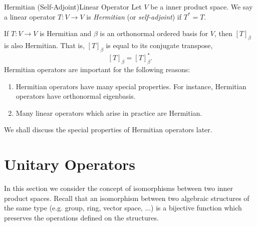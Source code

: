 \documentclass[linearalgebraII]{subfiles}
\begin{document}
    \begin{definition}{Hermitian (Self-Adjoint)}{Linear Operator}
        Let $V$ be a inner product space. We say a linear operator $T:V\to V$ is \emph{Hermitian} (or \emph{self-adjoint}) if $T^* = T$.
    \end{definition}

    \noindent If $T:V\to V$ is Hermitian and $\beta$ is an orthonormal ordered basis for $V$, then $\left[ T \right] _\beta$ is also Hermitian. That is, $\left[ T \right] _\beta$ is equal to its conjugate transpose,
    \begin{equation*}
        \left[ T \right] _\beta = \left[ T \right] _\beta^*.
    \end{equation*}
    Hermitian operators are important for the following reasons:
    \begin{enumerate}
        \item Hermitian operators have many special properties. For instance, Hermitian operators have orthonormal eigenbasis.
        \item Many linear operators which arise in practice are Hermitian.
    \end{enumerate}
    We shall discuss the special properties of Hermitian operators later.

    \section{Unitary Operators}
    
    \begin{remark}
        In this section we consider the concept of isomorphisms between two inner product spaces. Recall that an isomorphism between two algebraic structures of the same type (e.g. group, ring, vector space, ...) is a bijective function which preserves the operations defined on the structures.
    \end{remark}
\end{document}
